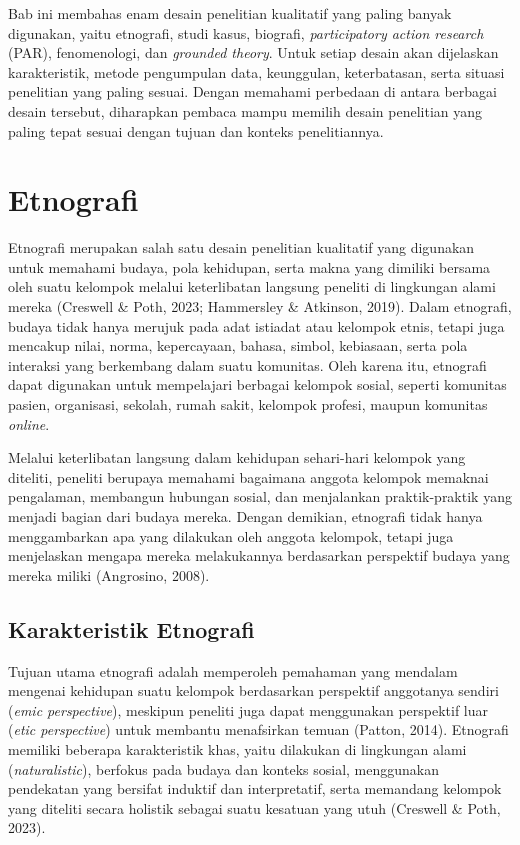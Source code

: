 \documentclass[
  indonesian,
  letterpaper,
  DIV=11,
  numbers=noendperiod]{scrreprt}
\begin{document}
Bab ini membahas enam desain penelitian kualitatif yang paling banyak
digunakan, yaitu etnografi, studi kasus, biografi, \emph{participatory
action research} (PAR), fenomenologi, dan \emph{grounded theory}. Untuk
setiap desain akan dijelaskan karakteristik, metode pengumpulan data,
keunggulan, keterbatasan, serta situasi penelitian yang paling sesuai.
Dengan memahami perbedaan di antara berbagai desain tersebut, diharapkan
pembaca mampu memilih desain penelitian yang paling tepat sesuai dengan
tujuan dan konteks penelitiannya.

\section{Etnografi}\label{etnografi}

Etnografi merupakan salah satu desain penelitian kualitatif yang
digunakan untuk memahami budaya, pola kehidupan, serta makna yang
dimiliki bersama oleh suatu kelompok melalui keterlibatan langsung
peneliti di lingkungan alami mereka (Creswell \& Poth, 2023; Hammersley
\& Atkinson, 2019). Dalam etnografi, budaya tidak hanya merujuk pada
adat istiadat atau kelompok etnis, tetapi juga mencakup nilai, norma,
kepercayaan, bahasa, simbol, kebiasaan, serta pola interaksi yang
berkembang dalam suatu komunitas. Oleh karena itu, etnografi dapat
digunakan untuk mempelajari berbagai kelompok sosial, seperti komunitas
pasien, organisasi, sekolah, rumah sakit, kelompok profesi, maupun
komunitas \emph{online}.

Melalui keterlibatan langsung dalam kehidupan sehari-hari kelompok yang
diteliti, peneliti berupaya memahami bagaimana anggota kelompok memaknai
pengalaman, membangun hubungan sosial, dan menjalankan praktik-praktik
yang menjadi bagian dari budaya mereka. Dengan demikian, etnografi tidak
hanya menggambarkan apa yang dilakukan oleh anggota kelompok, tetapi
juga menjelaskan mengapa mereka melakukannya berdasarkan perspektif
budaya yang mereka miliki (Angrosino, 2008).

\subsection{Karakteristik Etnografi}\label{karakteristik-etnografi}

Tujuan utama etnografi adalah memperoleh pemahaman yang mendalam
mengenai kehidupan suatu kelompok berdasarkan perspektif anggotanya
sendiri (\emph{emic perspective}), meskipun peneliti juga dapat
menggunakan perspektif luar (\emph{etic perspective}) untuk membantu
menafsirkan temuan (Patton, 2014). Etnografi memiliki beberapa
karakteristik khas, yaitu dilakukan di lingkungan alami
(\emph{naturalistic}), berfokus pada budaya dan konteks sosial,
menggunakan pendekatan yang bersifat induktif dan interpretatif, serta
memandang kelompok yang diteliti secara holistik sebagai suatu kesatuan
yang utuh (Creswell \& Poth, 2023).
\end{document}
